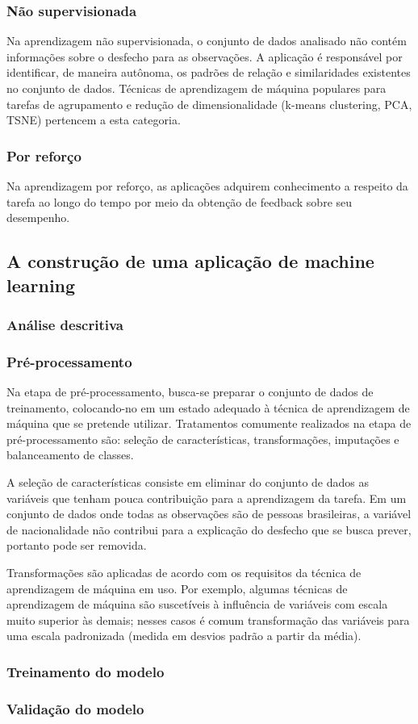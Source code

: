 \subsubsection{Não supervisionada}
Na aprendizagem não supervisionada, o conjunto de dados analisado não contém informações sobre o desfecho para
as observações. A aplicação é responsável por identificar, de maneira autônoma, os padrões de relação e similaridades existentes
no conjunto de dados. Técnicas de aprendizagem de máquina populares para tarefas de agrupamento e redução de dimensionalidade
(k-means clustering, PCA, TSNE) pertencem a esta categoria.

\subsubsection{Por reforço}
Na aprendizagem por reforço, as aplicações adquirem conhecimento a respeito da tarefa ao longo do tempo por meio da obtenção
de feedback sobre seu desempenho.

\subsection{A construção de uma aplicação de machine learning}
\subsubsection{Análise descritiva}
\subsubsection{Pré-processamento}
Na etapa de pré-processamento, busca-se preparar o conjunto de dados de treinamento, colocando-no em um estado adequado à técnica
de aprendizagem de máquina que se pretende utilizar. Tratamentos comumente realizados na etapa de pré-processamento são: seleção de
características, transformações, imputações e balanceamento de classes.

A seleção de características consiste em eliminar do conjunto de dados as variáveis que tenham pouca contribuição para a aprendizagem da tarefa.
Em um conjunto de dados onde todas as observações são de pessoas brasileiras, a variável de nacionalidade não contribui para a explicação do desfecho
que se busca prever, portanto pode ser removida.

Transformações são aplicadas de acordo com os requisitos da técnica de aprendizagem de máquina em uso. Por exemplo, algumas técnicas de aprendizagem
de máquina são suscetíveis à influência de variáveis com escala muito superior às demais; nesses casos é comum transformação das variáveis para uma escala
padronizada (medida em desvios padrão a partir da média).

\subsubsection{Treinamento do modelo}
\subsubsection{Validação do modelo}
